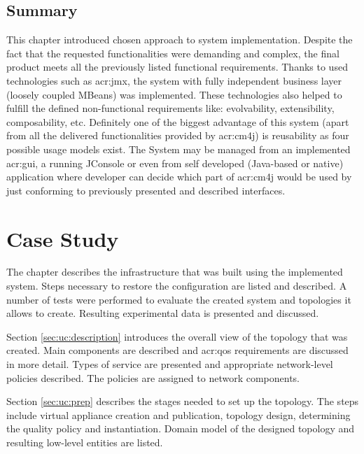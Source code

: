 \documentclass[11pt,openany]{book}
\begin{document}
    \section*{Summary}
    \label{sec:impl:summary}

      This chapter introduced chosen approach to system implementation. Despite the fact that the requested
      functionalities were demanding and complex, the final product meets all the previously listed functional
      requirements. Thanks to used technologies such as \gls{acr:jmx}, the system with fully independent business layer
      (loosely coupled MBeans) was implemented. These technologies also helped to fulfill the defined non-functional
      requirements like: evolvability, extensibility, composability, etc. Definitely one of the biggest advantage of
      this system (apart from all the delivered functionalities provided by \gls{acr:cm4j}) is reusability as four
      possible usage models exist. The System may be managed from an implemented \gls{acr:gui}, a running JConsole or
      even from self developed (Java-based or native) application where developer can decide which part of
      \gls{acr:cm4j} would be used by just conforming to previously presented and described interfaces.


  \chapter{Case Study}
  \label{chap:cs}

    The chapter describes the infrastructure that was built using the implemented system. Steps necessary to restore the
    configuration are listed and described. A number of tests were performed to evaluate the created system and
    topologies it allows to create. Resulting experimental data is presented and discussed.

    Section \ref{sec:uc:description} introduces the overall view of the topology that was created. Main components are
    described and \gls{acr:qos} requirements are discussed in more detail. Types of service are presented and
    appropriate network-level policies described. The policies are assigned to network components.

    Section \ref{sec:uc:prep} describes the stages needed to set up the topology. The steps include virtual appliance
    creation and publication, topology design, determining the quality policy and instantiation. Domain model of the
    designed topology and resulting low-level entities are listed.
\end{document}
